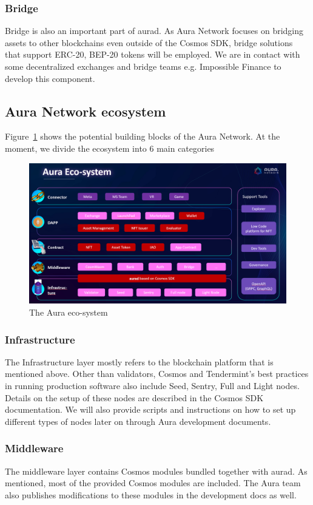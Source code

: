 \documentclass[11pt, titlepage]{article}
\begin{document}
\subsubsection*{Bridge}
Bridge is also an important part of aurad. As Aura Network focuses on bridging assets to other blockchains even outside of the Cosmos SDK, bridge solutions that support ERC-20, BEP-20 tokens will be employed. We are in contact with some decentralized exchanges and bridge teams e.g. Impossible Finance to develop this component. 

\subsection{Aura Network ecosystem}
Figure~\ref{fig:auraeco} shows the potential building blocks of the Aura Network. At the moment, we divide the ecosystem into 6 main categories

\begin{figure}[ht]
\label{fig:auraeco}
\includegraphics[width=14cm]{img/auraeco.png}
\centering
\caption{The Aura eco-system}
\end{figure}

\subsubsection*{Infrastructure}
The Infrastructure layer mostly refers to the blockchain platform that is mentioned above. Other than validators, Cosmos and Tendermint's best practices in running production software also include Seed, Sentry, Full and Light nodes. Details on the setup of these nodes are described in the Cosmos SDK documentation. We will also provide scripts and instructions on how to set up different types of nodes later on through Aura development documents.

\subsubsection*{Middleware}
The middleware layer contains Cosmos modules bundled together with aurad. As mentioned, most of the provided Cosmos modules are included. The Aura team also publishes modifications to these modules in the development docs as well.
\end{document}
